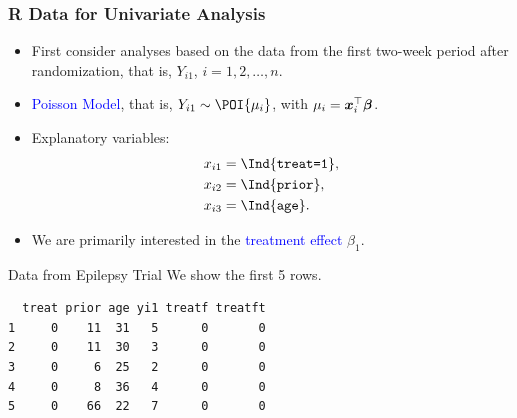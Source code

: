 \documentclass[oneside]{book}\usepackage[]{graphicx}\usepackage[svgnames]{xcolor}
\makeatletter
\newenvironment{kframe}{%
 \def\at@end@of@kframe{}%
 \ifinner\ifhmode%
  \def\at@end@of@kframe{\end{minipage}}%
  \begin{minipage}{\columnwidth}%
 \fi\fi%
 \def\FrameCommand##1{\hskip\@totalleftmargin \hskip-\fboxsep
 \colorbox{shadecolor}{##1}\hskip-\fboxsep
     \hskip-\linewidth \hskip-\@totalleftmargin \hskip\columnwidth}%
 \MakeFramed {\advance\hsize-\width
   \@totalleftmargin\z@ \linewidth\hsize
   \@setminipage}}%
 {\par\unskip\endMakeFramed%
 \at@end@of@kframe}
\newenvironment{knitrout}{}{} %
\let\log\relax%
\providecommand{\Vector}[1]{\bm{#1}}%
\makeatother
\begin{document}
\subsubsection*{R Data for Univariate Analysis}
\begin{itemize}
      \item First consider analyses based on the data from the first two-week period after
            randomization, that is, $ Y_{i1} $, $ i=1,2,\ldots,n $.
      \item \textcolor{Blue}{Poisson Model}, that is, $ Y_{i1}\sim \POI{\mu_i} $, with $ \log{\mu_i}=\Vector{x}_i^\top \Vector{\beta} $.
      \item Explanatory variables:
            \begin{align*}
                  x_{i1} & =\Ind{\texttt{treat=1}}, \\
                  x_{i2} & =\Ind{\texttt{prior}},   \\
                  x_{i3} & =\Ind{\texttt{age}}.
            \end{align*}
      \item We are primarily interested in the \textcolor{Blue}{treatment effect} $ \beta_1 $.
\end{itemize}
\begin{Example}{Data from Epilepsy Trial}
      We show the first 5 rows.
\begin{knitrout}
\color{fgcolor}\begin{kframe}
\begin{verbatim}
  treat prior age yi1 treatf treatft
1     0    11  31   5      0       0
2     0    11  30   3      0       0
3     0     6  25   2      0       0
4     0     8  36   4      0       0
5     0    66  22   7      0       0
\end{verbatim}
\end{kframe}
\end{knitrout}
\end{Example}
\end{document}
